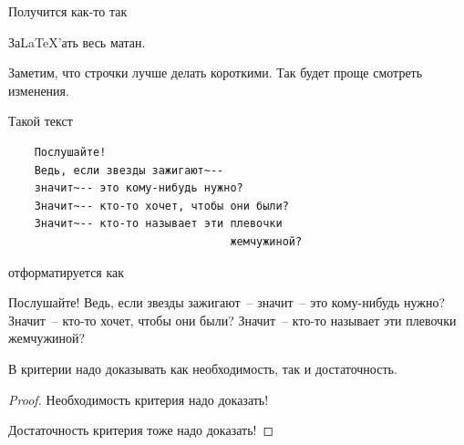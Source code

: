 \documentclass[../../main.tex]{subfiles}
\begin{document}
\begin{crl*}
    Получится как-то так
\end{crl*}

\begin{exc}
    За\LaTeX'ать весь матан.
\end{exc}

\bigskip

Заметим, что строчки лучше делать короткими.
Так будет проще смотреть изменения.

\begin{exmp}[Маяковский]

    Такой текст

\begin{verbatim}
    Послушайте!
    Ведь, если звезды зажигают~--
    значит~-- это кому-нибудь нужно?
    Значит~-- кто-то хочет, чтобы они были?
    Значит~-- кто-то называет эти плевочки
                                  жемчужиной?
\end{verbatim}

    отформатируется как

    \medskip

    Послушайте!
    Ведь, если звезды зажигают~--
    значит~-- это кому-нибудь нужно?
    Значит~-- кто-то хочет, чтобы они были?
    Значит~-- кто-то называет эти плевочки
                                  жемчужиной?

\end{exmp}

\begin{thm}[Критерий]
 В критерии надо доказывать как необходимость, так и
 достаточность.
\end{thm}

\begin{proof}
 \quad

 \nec Необходимость критерия надо доказать!

 \suff Достаточность критерия тоже надо доказать!

\end{proof}
\end{document}
